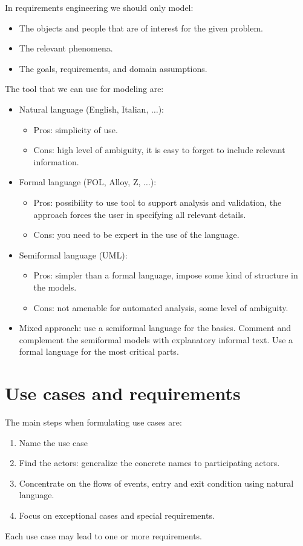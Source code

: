 \documentclass[12pt, a4paper]{report}
\begin{document}
    In requirements engineering we should only model:
    \begin{itemize}
        \item The objects and people that are of interest for the given problem.
        \item The relevant phenomena.
        \item The goals, requirements, and domain assumptions.
    \end{itemize}
    The tool that we can use for modeling are: 
    \begin{itemize}
        \item Natural language (English, Italian, $\dots$):
            \begin{itemize}
                \item Pros: simplicity of use.
                \item Cons: high level of ambiguity, it is easy to forget to include relevant information.
            \end{itemize}
        \item Formal language (FOL, Alloy, Z, $\dots$):
            \begin{itemize}
                \item Pros: possibility to use tool to support analysis and validation, the approach forces the user in specifying all relevant details.
                \item Cons: you need to be expert in the use of the language.
            \end{itemize}
        \item Semiformal language (UML):
            \begin{itemize}
                \item Pros: simpler than a formal language, impose some kind of structure in the models.
                \item Cons: not amenable for automated analysis, some level of ambiguity.
            \end{itemize}
        \item Mixed approach: use a semiformal language for the basics. Comment and complement the semiformal models with explanatory informal text. Use a formal language for the 
            most critical parts.
    \end{itemize}

    \section{Use cases and requirements}
    The main steps when formulating use cases are: 
    \begin{enumerate}
        \item Name the use case
        \item Find the actors: generalize the concrete names to participating actors.
        \item Concentrate on the flows of events, entry and exit condition using natural language.
        \item Focus on exceptional cases and special requirements.
    \end{enumerate}
    Each use case may lead to one or more requirements.
     
\end{document}
